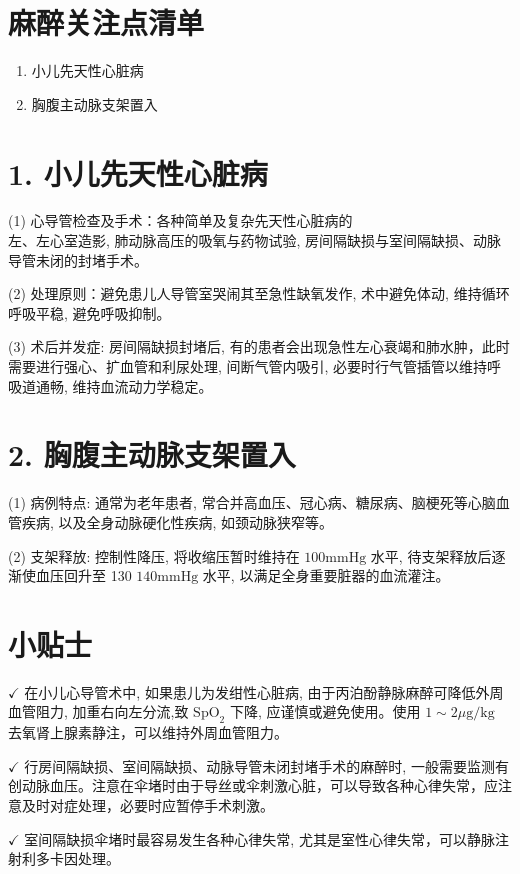 \documentclass[10pt]{article}
\begin{document}
\section*{麻醉关注点清单}
\begin{enumerate}
  \item 小儿先天性心脏病

  \item 胸腹主动脉支架置入

\end{enumerate}

\section*{1. 小儿先天性心脏病}
(1) 心导管检查及手术：各种简单及复杂先天性心脏病的\\
左、左心室造影, 肺动脉高压的吸氧与药物试验, 房间隔缺损与室间隔缺损、动脉导管未闭的封堵手术。

(2) 处理原则：避免患儿人导管室哭闹其至急性缺氧发作, 术中避免体动, 维持循环呼吸平稳, 避免呼吸抑制。

(3) 术后并发症: 房间隔缺损封堵后, 有的患者会出现急性左心衰竭和肺水肿，此时需要进行强心、扩血管和利尿处理, 间断气管内吸引, 必要时行气管插管以维持呼吸道通畅, 维持血流动力学稳定。

\section*{2. 胸腹主动脉支架置入}
(1) 病例特点: 通常为老年患者, 常合并高血压、冠心病、糖尿病、脑梗死等心脑血管疾病, 以及全身动脉硬化性疾病, 如颈动脉狭窄等。

(2) 支架释放: 控制性降压, 将收缩压暂时维持在 $100 \mathrm{mmHg}$ 水平, 待支架释放后逐渐使血压回升至 130 $140 \mathrm{mmHg}$ 水平, 以满足全身重要脏器的血流灌注。

\section*{小贴士}
$\checkmark$ 在小儿心导管术中, 如果患儿为发绀性心脏病, 由于丙泊酚静脉麻醉可降低外周血管阻力, 加重右向左分流,致 $\mathrm{SpO}_{2}$ 下降, 应谨慎或避免使用。使用 $1 \sim 2 \mu \mathrm{g} / \mathrm{kg}$ 去氧肾上腺素静注，可以维持外周血管阻力。

$\checkmark$ 行房间隔缺损、室间隔缺损、动脉导管未闭封堵手术的麻醉时, 一般需要监测有创动脉血压。注意在伞堵时由于导丝或伞刺激心脏，可以导致各种心律失常，应注意及时对症处理，必要时应暂停手术刺激。

$\checkmark$ 室间隔缺损伞堵时最容易发生各种心律失常, 尤其是室性心律失常，可以静脉注射利多卡因处理。
\end{document}
